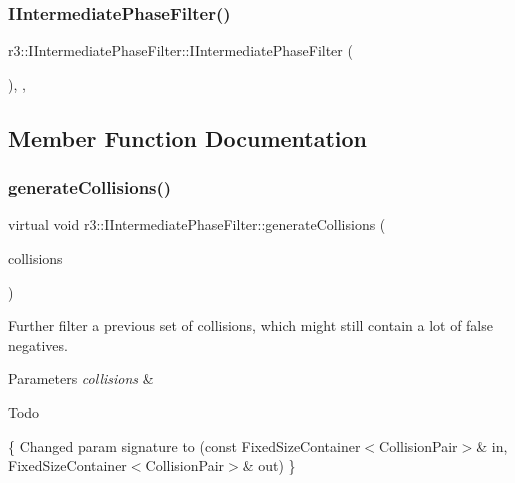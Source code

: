 \subsubsection{\texorpdfstring{I\+Intermediate\+Phase\+Filter()}{IIntermediatePhaseFilter()}}
{\footnotesize\ttfamily r3\+::\+I\+Intermediate\+Phase\+Filter\+::\+I\+Intermediate\+Phase\+Filter (\begin{DoxyParamCaption}{ }\end{DoxyParamCaption})\hspace{0.3cm}{\ttfamily [explicit]}, {\ttfamily [protected]}, {\ttfamily [default]}}



\subsection{Member Function Documentation}
\mbox{\label{classr3_1_1_i_intermediate_phase_filter_a0b235161317095e134661aa49beb909d}} 
\subsubsection{\texorpdfstring{generate\+Collisions()}{generateCollisions()}}
{\footnotesize\ttfamily virtual void r3\+::\+I\+Intermediate\+Phase\+Filter\+::generate\+Collisions (\begin{DoxyParamCaption}\item[{\mbox{\hyperlink{classr3_1_1_fixed_size_container}{Fixed\+Size\+Container}}$<$ \mbox{\hyperlink{classr3_1_1_collision_pair}{Collision\+Pair}} $>$ \&}]{collisions }\end{DoxyParamCaption})\hspace{0.3cm}{\ttfamily [pure virtual]}}



Further filter a previous set of collisions, which might still contain a lot of false negatives. 


\begin{DoxyParams}{Parameters}
{\em collisions} & \\
\hline
\end{DoxyParams}
\begin{DoxyRefDesc}{Todo}
\item[\mbox{\hyperlink{todo__todo000008}{Todo}}]\{ Changed param signature to (const Fixed\+Size\+Container$<$\+Collision\+Pair$>$\& in, Fixed\+Size\+Container$<$\+Collision\+Pair$>$\& out) \} \end{DoxyRefDesc}


